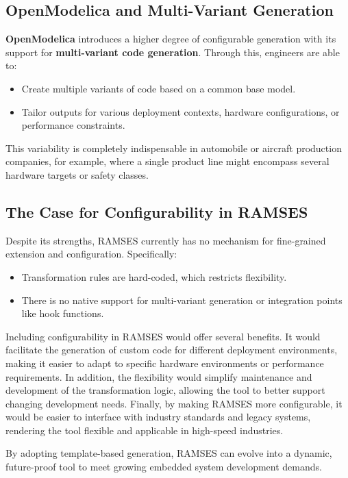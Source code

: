 \subsection{OpenModelica and Multi-Variant Generation}
\label{sec:open_model}

\textbf{OpenModelica} introduces a higher degree of configurable generation with its support for \textbf{multi-variant code generation}. Through this, engineers are able to:
\begin{itemize} 
	\item Create multiple variants of code based on a common base model.
	\item Tailor outputs for various deployment contexts, hardware configurations, or performance constraints.
\end{itemize}

This variability is completely indispensable in automobile or aircraft production companies, for example, where a single product line might encompass several hardware targets or safety classes.


\subsection{The Case for Configurability in RAMSES}
\label{sec:config}

Despite its strengths, \gls{RAMSES} currently has no mechanism for fine-grained extension and configuration.
Specifically:

\begin{itemize} 
	\item Transformation rules are hard-coded, which restricts flexibility.
	\item There is no native support for multi-variant generation or integration points like hook functions. 
\end{itemize}

Including configurability in \gls{RAMSES} would offer several benefits. It would facilitate the generation of custom code for different deployment environments, making it easier to adapt to specific hardware environments or performance requirements. In addition, the flexibility would simplify maintenance and development of the transformation logic, allowing the tool to better support changing development needs. Finally, by making \gls{RAMSES} more configurable, it would be easier to interface with industry standards and legacy systems, rendering the tool flexible and applicable in high-speed industries.

\begin{tcolorbox}[colback=green!5, colframe=green!40!black] By adopting template-based generation, \gls{RAMSES} can evolve into a dynamic, future-proof tool to meet growing embedded system development demands. \end{tcolorbox}




